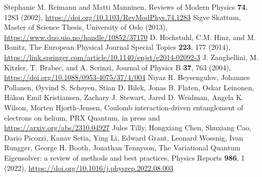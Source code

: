 \documentclass{article}
\begin{document}
\begin{thebibliography}{99}

 Stephanie M. Reimann and Matti Manninen, Reviews of  Modern Physics {\bf 74}, 1283 (2002), \url{https://doi.org/10.1103/RevModPhys.74.1283}
 Sigve Skattum, Master of Science Thesis, University of Oslo (2013), \url{https://www.duo.uio.no/handle/10852/37170}  
 D. Hochstuhl, C.M. Hinz, and M. Bonitz, The European Physical Journal Special Topics {\bf 223}, 177 (2014), \url{https://link.springer.com/article/10.1140/epjst/e2014-02092-3}
 J. Zanghellini, M. Kitzler, T. Brabec, and A. Scrinzi, Journal of Physics  B {\bf 37}, 763 (2004), \url{https://doi.org/10.1088/0953-4075/37/4/004}
 Niyaz R. Beysengulov, Johannes Pollanen, Øyvind S. Schøyen, Stian D. Bilek, Jonas B. Flaten, Oskar Leinonen, Håkon Emil Kristiansen, Zachary J. Stewart, Jared D. Weidman, Angela K. Wilson, Morten Hjorth-Jensen, Coulomb interaction-driven entanglement of electrons on helium, PRX Quantum, in press and \url{https://arxiv.org/abs/2310.04927}
 Jules Tilly, Hongxiang Chen, Shuxiang Cao, Dario Picozzi, Kanav Setia, Ying Li, Edward Grant, Leonard Wossnig, Ivan Rungger, George H. Booth, Jonathan Tennyson, The Variational Quantum Eigensolver: a review of methods and best practices, Physics Reports {\bf 986}, 1 (2022), \url{https://doi.org/10.1016/j.physrep.2022.08.003}
\end{thebibliography}  
\end{document}
